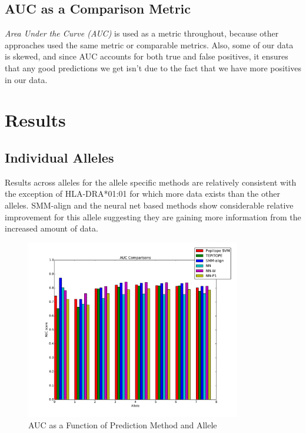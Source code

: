 \documentclass[journal]{IEEEtran}
\begin{document}
\subsection{AUC as a Comparison Metric} 
\textit{Area Under the Curve (AUC)} is used as a metric throughout, because other approaches used the same metric or comparable metrics. Also, some of our data is skewed, and since AUC accounts for both true and false positives, it ensures that any good predictions we get isn't due to the fact that we have more positives in our data.


\section{Results}

\subsection{Individual Alleles}
Results across alleles for the allele specific methods are relatively consistent with the exception of HLA-DRA*01:01 for which more data exists than the other alleles.  SMM-align and the neural net based methods show considerable relative improvement for this allele suggesting they are gaining more information from the increased amount of data.

\begin{figure}[!h]
\centering
\includegraphics[width=3.7in]{individual}
\caption{AUC as a Function of Prediction Method and Allele}
\label{fig_sim}
\end{figure}
\end{document}
